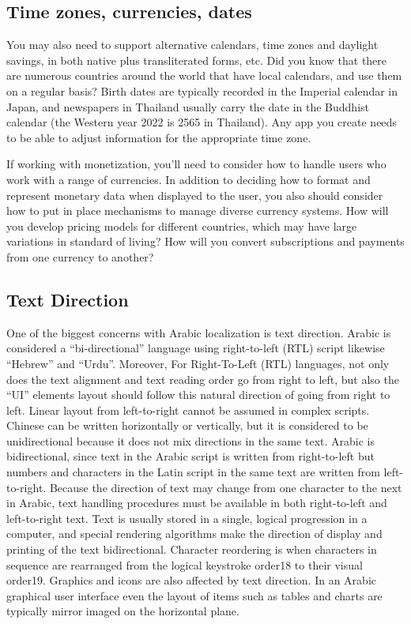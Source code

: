 \documentclass[
	a4paper, %
	10pt, %
	unnumberedsections, %
	twoside, %
]{LTJournalArticle}
\begin{document}
\subsection {Time zones, currencies, dates}

You may also need to support alternative calendars, time zones and daylight savings, in both native plus transliterated forms, etc. Did you know that there are numerous countries around the world that have local calendars, and use them on a regular basis? Birth dates are typically recorded in the Imperial calendar in Japan, and newspapers in Thailand usually carry the date in the Buddhist calendar (the Western year 2022 is 2565 in Thailand). Any app you create needs to be able to adjust information for the appropriate time zone.

If working with monetization, you'll need to consider how to handle users who work with a range of currencies. In addition to deciding how to format and represent monetary data when displayed to the user, you also should consider how to put in place mechanisms to manage diverse currency systems. How will you develop pricing models for different countries, which may have large variations in standard of living? How will you convert subscriptions and payments from one currency to another?

\subsection{Text Direction}

One of the biggest concerns with Arabic localization is text direction. Arabic is considered a “bi-directional” language using right-to-left (RTL) script likewise “Hebrew” and “Urdu”. Moreover, For Right-To-Left (RTL) languages, not only does the text alignment and text reading order go from right to left, but also the “UI” elements layout should follow this natural direction of going from right to left. Linear layout from left-to-right cannot be assumed in complex scripts. Chinese can be written horizontally or vertically, but it is considered to be unidirectional because it does not mix directions in the same text. Arabic is bidirectional, since text in the Arabic script is written from right-to-left but numbers and characters in the Latin script in the same text are written from left-to-right. Because the direction of text may change from one character to the next in Arabic, text handling procedures must be available in both right-to-left and left-to-right text. Text is usually stored in a single, logical progression in a computer, and special rendering algorithms make the direction of display and printing of the text bidirectional. Character reordering is when characters in sequence are rearranged from the logical keystroke order18 to their visual order19. Graphics and icons are also affected by text direction. In an Arabic graphical user interface even the layout of items such as tables and charts are typically mirror imaged on the horizontal plane.
\end{document}
